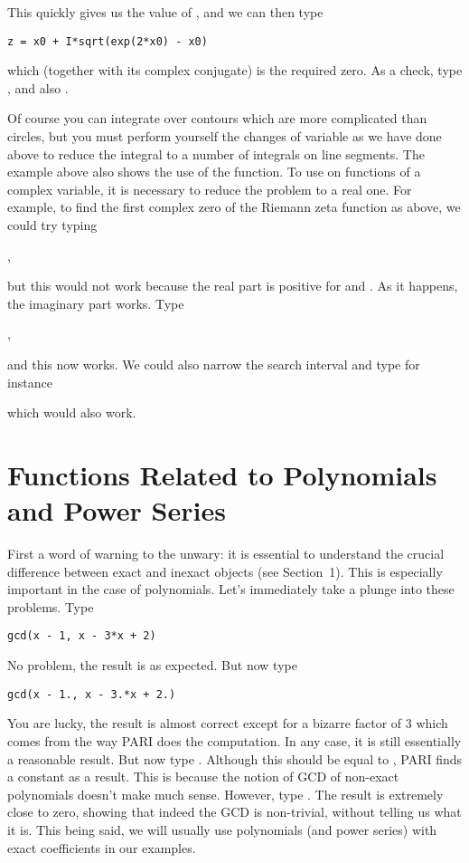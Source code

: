 This quickly gives us the value of , and we can then type

\centerline{\tt z = x0 + I*sqrt(exp(2*x0) - x0)}

\noindent which (together with its complex conjugate) is the required zero.
As a check, type , and also .

Of course you can integrate over contours which are more complicated than
circles, but you must perform yourself the changes of variable as we have
done above to reduce the integral to a number of integrals on line segments.
\smallskip
%
The example above also shows the use of the  function. To use
 on functions of a complex variable, it is necessary to reduce the
problem to a real one. For example, to find the first complex zero of the
Riemann zeta function as above, we could try typing

,

\noindent but this would not work because the real part is positive for
 and . As it happens, the imaginary part works. Type

,

\noindent and this now works. We could also narrow the search interval and
type for instance


\noindent which would also work.

\section{Functions Related to Polynomials and Power Series}

First a word of warning to the unwary: it is essential to understand the
crucial difference between exact and inexact objects (see Section~1). This
is especially important in the case of polynomials. Let's immediately take
a plunge into these problems. Type

\centerline{\tt gcd(x - 1, x - 3*x + 2)}

 No problem, the result is  as expected. But now type

\centerline{\tt gcd(x - 1., x - 3.*x + 2.)}

 You are lucky, the result is almost correct except for a bizarre factor of
3 which comes from the way PARI does the computation. In any case, it is still
essentially a reasonable result. But now type
.
Although this should be equal to , PARI finds a
constant as a result. This is because the notion of GCD of non-exact
polynomials doesn't make much sense. However, type
.
The result is extremely close to zero, showing that indeed the GCD is
non-trivial, without telling us what it is. This being said, we will usually
use polynomials (and power series) with exact coefficients in our
examples.\smallskip

